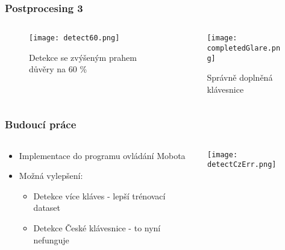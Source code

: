 \begin{frame}
   \frametitle{Postprocesing 3}
   \begin{columns}[t, onlytextwidth]
      \begin{column}[T]{0.5\textwidth}
         \begin{figure}[h]
         		\centering
         		\texttt{[image: detect60.png]}
			\caption{Detekce se zvýšeným prahem důvěry na 60 \%}
		\end{figure}
      \end{column}
      \begin{column}[T]{0.50\textwidth}
		\begin{figure}[h]
         		\centering
         		\texttt{[image: completedGlare.png]}
			\caption{Správně doplněná klávesnice}
		\end{figure}
      \end{column}
   \end{columns}
\end{frame}

\begin{frame}
   \frametitle{Budoucí práce}
   \begin{columns}[t, onlytextwidth]
      \begin{column}[T]{0.5\textwidth}
         	\begin{itemize}
            \item Implementace do programu ovládání Mobota
			\item Možná vylepšení:
			\begin{itemize}
				\item Detekce více kláves - lepší trénovací dataset
				\item Detekce České klávesnice - to nyní nefunguje
			\end{itemize}
        \end{itemize}

      \end{column}
      \begin{column}[T]{0.49\textwidth}
         \centering
         \texttt{[image: detectCzErr.png]}
      \end{column}
   \end{columns}
\end{frame}

